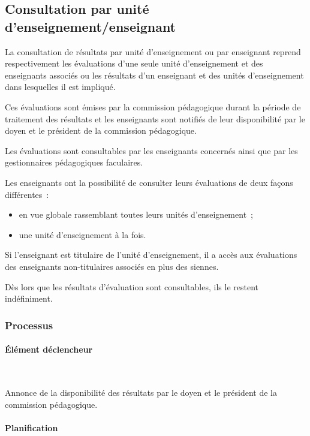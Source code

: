 \documentclass[a4paper,11pt]{report}
\begin{document}
\subsection{Consultation par unité d'enseignement/enseignant}

La consultation de résultats par unité d'enseignement ou par enseignant reprend respectivement les évaluations d'une seule unité d'enseignement et des enseignants associés ou les résultats d'un enseignant et des unités d'enseignement dans lesquelles il est impliqué.

Ces évaluations sont émises par la commission pédagogique durant la période de traitement des résultats et les enseignants sont notifiés de leur disponibilité par le doyen et le président de la commission pédagogique.

Les évaluations sont consultables par les enseignants concernés ainsi que par les gestionnaires pédagogiques faculaires.

Les enseignants ont la possibilité de consulter leurs évaluations de deux façons différentes~:
\begin{itemize}
	\item en vue globale rassemblant toutes leurs unités d'enseignement~;
	\item une unité d'enseignement à la fois.
\end{itemize}

Si l'enseignant est titulaire de l'unité d'enseignement, il a accès aux évaluations des enseignants non-titulaires associés en plus des siennes.

Dès lors que les résultats d'évaluation sont consultables, ils le restent indéfiniment.

\subsubsection{Processus}
\paragraph{Élément déclencheur}~\newline{}

Annonce de la disponibilité des résultats par le doyen et le président de la commission pédagogique.

\paragraph{Planification}~\newline{}
\end{document}
